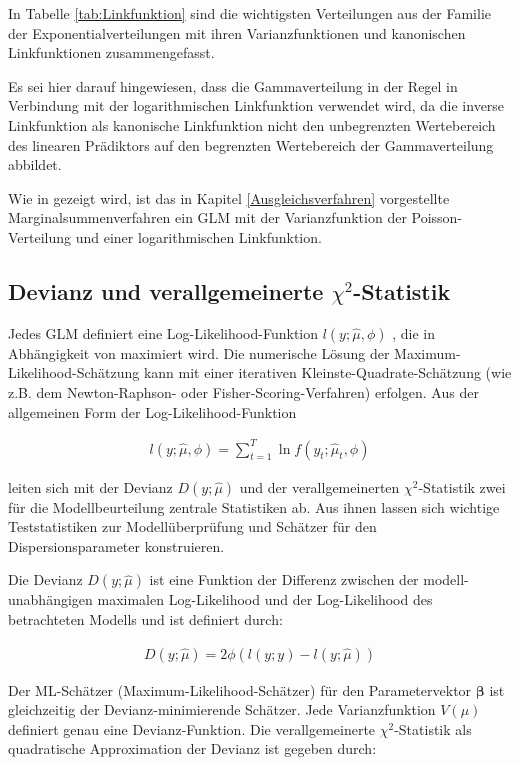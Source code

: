 In Tabelle \ref{tab:Linkfunktion} sind die wichtigsten Verteilungen aus der Familie der Exponentialverteilungen mit ihren Varianzfunktionen und kanonischen Linkfunktionen zusammengefasst.

Es sei hier darauf hingewiesen, dass die Gammaverteilung in der Regel in Verbindung mit der logarithmischen Linkfunktion verwendet wird, da die inverse Linkfunktion als kanonische Linkfunktion nicht den unbegrenzten Wertebereich des linearen Prädiktors auf den begrenzten Wertebereich der Gammaverteilung abbildet.

Wie in \cite{Mack} gezeigt wird, ist das in Kapitel \ref{Ausgleichsverfahren} vorgestellte Marginalsummenverfahren ein GLM mit der Varianzfunktion der Poisson-Verteilung und einer logarithmischen Linkfunktion.


\subsection{Devianz und verallgemeinerte $\chi^2$-Statistik} \label{section:Devianz}

Jedes GLM definiert eine Log-Likelihood-Funktion $l(y;\hat{\mu}, \phi)$ , die in Abhängigkeit von   maximiert wird. Die numerische Lösung der Maximum-Likelihood-Schätzung kann mit einer iterativen Kleinste-Quadrate-Schätzung (wie z.B. dem Newton-Raphson- oder Fisher-Scoring-Verfahren) erfolgen. Aus der allgemeinen Form der Log-Likelihood-Funktion

\begin{eqnarray}
l(y;\hat{\mu}, \phi)=\sum_{t=1}^T \ln f(y_t;\hat{\mu}_t, \phi)
\end{eqnarray}

leiten sich mit der Devianz $D(y;\hat{\mu})$ und der verallgemeinerten  $\chi^2$-Statistik zwei für die Modellbeurteilung zentrale Statistiken ab. Aus ihnen lassen sich wichtige Teststatistiken zur Modellüberprüfung und Schätzer für den Dispersionsparameter konstruieren.

Die Devianz  $D(y;\hat{\mu})$ ist eine Funktion der Differenz zwischen der modell-unabhängigen maximalen Log-Likelihood und der Log-Likelihood des betrachteten Modells und ist definiert durch:

\begin{eqnarray} \label{eq:5}
D(y;\hat{\mu})=2\phi(l(y;y)-l(y;\hat{\mu}))
\end{eqnarray}

Der ML-Schätzer (Maximum-Likelihood-Schätzer) für den Parametervektor $\bm{\beta}$   ist gleichzeitig der Devianz-minimierende Schätzer. Jede Varianzfunktion $V(\mu)$  definiert genau eine Devianz-Funktion.
Die verallgemeinerte  $\chi^2$-Statistik als quadratische Approximation der Devianz ist gegeben durch:

